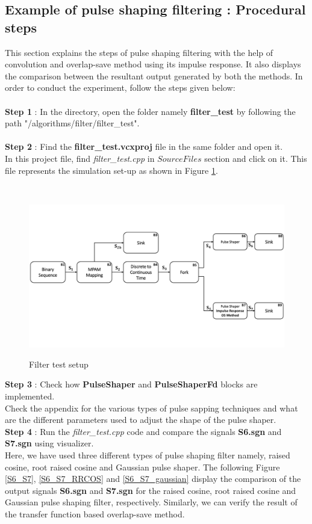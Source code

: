 \begin{refsection}
\subsection*{Example of pulse shaping filtering : Procedural steps}
This section explains the steps of pulse shaping filtering with the help of convolution and overlap-save method using its impulse response. It also displays the comparison between the resultant output generated by both the methods. In order to conduct the experiment, follow the steps given below:\\ \\
\textbf{Step 1} : In the directory, open the folder namely \textbf{filter\_test} by following the path  "/algorithms/filter/filter\_test".\\ \\
\textbf{Step 2} : Find the \textbf{filter\_test.vcxproj} file in the same folder and open it.\\
In this project file, find \textit{filter\_test.cpp} in $Source Files$ section and click on it. This file represents the simulation set-up as shown in Figure \ref{FilterTest}. \\ \\
\begin{figure}[h]
	\centering
	\includegraphics[height=7cm,width=13cm]{./algorithms/filter/figures/Test_Filter_Dia.pdf}
	\caption{Filter test setup}
	\label{FilterTest}
\end{figure}
\textbf{Step 3} : Check how \textbf{PulseShaper} and  \textbf{PulseShaperFd} blocks are implemented.\\
Check the appendix for the various types of pulse sapping techniques and what are the different parameters used to adjust the shape of the pulse shaper.\\
\textbf{Step 4} : Run the \textit{filter\_test.cpp} code and compare the  signals \textbf{S6.sgn} and \textbf{S7.sgn} using visualizer.\\
Here, we have used three different types of pulse shaping filter namely, raised cosine, root raised cosine and Gaussian pulse shaper. The following Figure \ref{S6_S7}, \ref{S6_S7_RRCOS}  and \ref{S6_S7_gaussian} display the comparison of the output signals \textbf{S6.sgn} and \textbf{S7.sgn} for the raised cosine, root raised cosine and Gaussian pulse shaping filter, respectively. Similarly, we can verify the result of the transfer function based overlap-save method.


\end{refsection}
